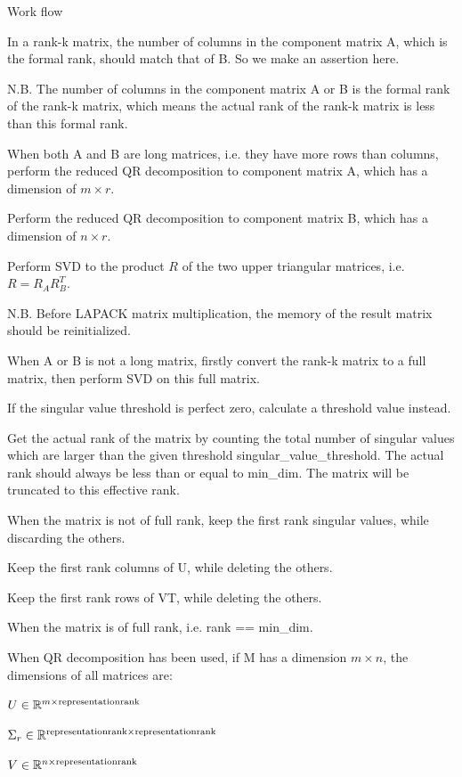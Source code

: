 \begin{DoxyDescription}
\item[Work flow ]

In a rank-\/k matrix, the number of columns in the component matrix {\ttfamily A}, which is the formal rank, should match that of {\ttfamily B}. So we make an assertion here.

N.\+B. The number of columns in the component matrix {\ttfamily A} or {\ttfamily B} is the formal rank of the rank-\/k matrix, which means the actual rank of the rank-\/k matrix is less than this formal rank.

When both {\ttfamily A} and {\ttfamily B} are long matrices, i.\+e. they have more rows than columns, perform the reduced QR decomposition to component matrix {\ttfamily A}, which has a dimension of $m \times r$.

Perform the reduced QR decomposition to component matrix {\ttfamily B}, which has a dimension of $n \times r$.

Perform S\+VD to the product $R$ of the two upper triangular matrices, i.\+e. $R = R_A R_B^T$.

N.\+B. Before L\+A\+P\+A\+CK matrix multiplication, the memory of the result matrix should be reinitialized.

When {\ttfamily A} or {\ttfamily B} is not a long matrix, firstly convert the rank-\/k matrix to a full matrix, then perform S\+VD on this full matrix.

If the singular value threshold is perfect zero, calculate a threshold value instead.

Get the actual rank of the matrix by counting the total number of singular values which are larger than the given threshold {\ttfamily singular\+\_\+value\+\_\+threshold}. The actual rank should always be less than or equal to {\ttfamily min\+\_\+dim}. The matrix will be truncated to this effective rank.

When the matrix is not of full rank, keep the first {\ttfamily rank} singular values, while discarding the others.

Keep the first {\ttfamily rank} columns of {\ttfamily U}, while deleting the others.

Keep the first {\ttfamily rank} rows of {\ttfamily VT}, while deleting the others.

When the matrix is of full rank, i.\+e. {\ttfamily rank} == {\ttfamily min\+\_\+dim}.

When QR decomposition has been used, if {\ttfamily M} has a dimension $m \times n$, the dimensions of all matrices are\+:
\begin{DoxyItemize}
\item $U \in \mathbb{R}^{m \times {\rm representation rank}}$
\item $\Sigma_r \in \mathbb{R}^{{\rm representation rank} \times {\rm representation rank}}$
\item $V \in \mathbb{R}^{n \times {\rm representation rank}}$
\end{DoxyItemize}


\end{DoxyDescription}
